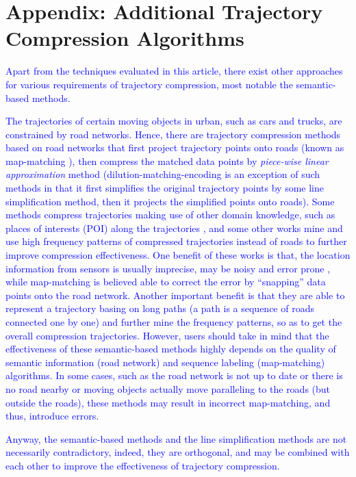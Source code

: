 \section*{{Appendix: Additional Trajectory Compression Algorithms}}
\textcolor{blue}{Apart from the techniques evaluated in this article, there exist other approaches for various requirements of trajectory compression, most notable the semantic-based methods.}

\textcolor{blue}{The trajectories of certain moving objects in urban, such as cars and trucks, are constrained by road networks. Hence, there are trajectory compression methods based on road networks \cite{Chen:Trajectory, Popa:Spatio,Civilis:Techniques,Hung:Clustering, Kellaris:Map, Song:PRESS, Han:Compress, Cao:Road} that first project trajectory points onto roads (known as map-matching \cite{Quddus:MapMatching}), then compress the matched data points by \emph{piece-wise linear approximation} method \cite{Elmeleegy:Stream, Xie:Stream,Luo:Streaming,ORourke:Fitting} (dilution-matching-encoding \cite{Gotsman:Compaction} is an exception of such methods in that it first simplifies the original trajectory points by some line simplification method, then it projects the simplified points onto roads).}
%
\textcolor{blue}{Some methods \cite{Schmid:Semantic, Richter:Semantic} compress trajectories making use of other domain knowledge, such as places of interests (POI) along the trajectories \cite{Richter:Semantic}, and some other works \cite{Gotsman:Compaction, Song:PRESS, Han:Compress,Koide:CiNCT} mine and use high frequency patterns of compressed trajectories instead of roads to further improve compression effectiveness.}
%
\textcolor{blue}{One benefit of these works is that, the location information from sensors is usually imprecise, may be noisy and error prone \cite{Cao:Road}, while map-matching is believed able to correct the error by “snapping” data points onto the road network.
Another important benefit is that they are able to represent a trajectory basing on long paths (a path is a sequence of roads connected one by one) and further mine the frequency patterns, so as to get the overall compression trajectories.} 
%
\textcolor{blue}{However, users should take in mind that the effectiveness of these semantic-based methods highly depends on the quality of semantic information (\eg road network) and sequence labeling (\eg map-matching) algorithms. In some cases, such as the road network is not up to date or there is no road nearby or moving objects actually move paralleling to the roads (but outside the roads), these methods may result in incorrect map-matching, and thus, introduce errors.}

\textcolor{blue}{Anyway, the semantic-based methods and the line simplification methods are not necessarily contradictory, indeed, they are orthogonal, and may be combined with each other to improve the effectiveness of trajectory compression.}




